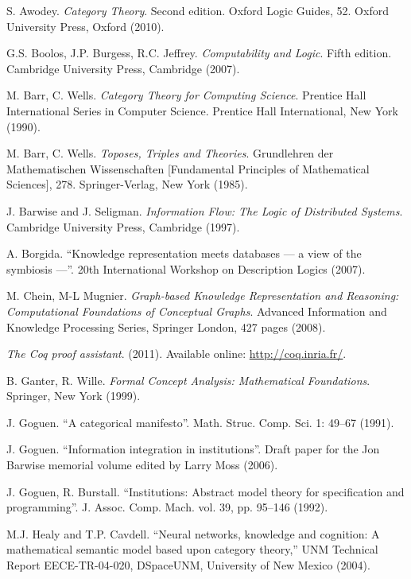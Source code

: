 \documentclass{amsart}
\def\rr{\raggedright}
\theoremstyle{remark}
\theoremstyle{definition}
\begin{document}

\begin{thebibliography}{JTT}\rr

 S. Awodey. 
{\em Category Theory}. Second edition. 
Oxford Logic Guides, 52. Oxford University Press, Oxford (2010).

 G.S. Boolos, J.P. Burgess, R.C. Jeffrey. 
{\em Computability and Logic}. 
Fifth edition. Cambridge University Press, Cambridge (2007).

 M. Barr, C. Wells. 
{\em Category Theory for Computing Science}. 
Prentice Hall International Series in Computer Science. Prentice Hall International, New York (1990).

 M. Barr, C. Wells. 
{\em Toposes, Triples and Theories}. 
Grundlehren der Mathematischen Wissenschaften [Fundamental Principles of Mathematical Sciences], 278. Springer-Verlag, New York (1985).

 J. Barwise and J. Seligman.
{\em Information Flow: The Logic of Distributed Systems}. 
Cambridge University Press, Cambridge (1997).

 A. Borgida. 
``Knowledge representation meets databases --- a view of the symbiosis ---''. 
20th International Workshop on Description Logics (2007).

 M. Chein, M-L Mugnier. 
{\em Graph-based Knowledge Representation and Reasoning: Computational Foundations of Conceptual Graphs}. 
Advanced Information and Knowledge Processing Series, Springer London, 427 pages (2008).

{\em The Coq proof assistant}. (2011). 
Available online: \url{http://coq.inria.fr/}.

 B. Ganter, R. Wille. 
{\em Formal Concept Analysis: Mathematical Foundations}. 
Springer, New York (1999).

 J. Goguen. 
``A categorical manifesto''. 
Math. Struc. Comp. Sci. 1: 49--67 (1991). 

 J. Goguen. 
``Information integration in institutions''.
Draft paper for the Jon Barwise memorial volume edited by Larry Moss (2006).

 J. Goguen, R. Burstall. 
``Institutions: Abstract model theory for specification and programming''. 
J. Assoc. Comp. Mach. vol. 39, pp. 95--146 (1992).

  M.J. Healy and T.P. Cavdell. 
``Neural networks, knowledge and cognition: A mathematical semantic model based upon category theory,''  
UNM Technical Report EECE-TR-04-020, DSpaceUNM, University of New Mexico (2004).


\end{thebibliography}
\end{document}
